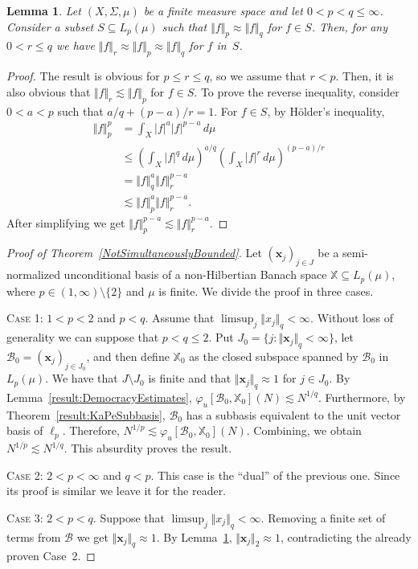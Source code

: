 \documentclass[11pt, leqno]{amsart}
\newtheorem{lemma}[theorem]{Lemma}
\theoremstyle{remark}
\numberwithin{equation}{section}
\newcommand{\XX}{\ensuremath{\mathbb{X}}}
\newcommand{\xx}{\ensuremath{\mathbf{x}}}
\newcommand{\BB}{\mathcal{B}}
\begin{document}
\begin{lemma}
\label{result:EquivalentNorms} 
Let $(X,\Sigma,\mu)$ be a finite measure space and let $0<p<q\le \infty$. Consider a subset $S\subseteq L_p(\mu)$ such that $\Vert f\Vert_p\approx\Vert f\Vert_q$ for $f\in S$. Then, for any $0<r\le q$ we have $\Vert f\Vert_r \approx\Vert f\Vert_p\approx\Vert f\Vert_q$ for $f$ in~$S$.
\end{lemma}

\begin{proof} 
The result is obvious for $p\le r\le q$, so we assume that $r<p$. Then, it is also obvious that $\Vert f\Vert_r\lesssim \Vert f\Vert_p$ for $f\in S$. To prove the reverse inequality, consider $0<a<p$ such that $a/q+(p-a)/r=1$.
 For $f\in S$, by H\"older's inequality,
\begin{align*}
\Vert f\Vert_p^p 
&=\int_X |f|^a |f|^{p-a} \, d \mu\\
&\le \left( \int_X |f|^{q}\, d\mu \right)^{a/q} \left( \int_X |f|^{r}\, d\mu \right)^{(p-a)/r}\\
&=\Vert f\Vert_q^a \Vert f\Vert_r^{p-a}\\
&\lesssim \Vert f\Vert_p^a \Vert f\Vert_r^{p-a}.
\end{align*}
After simplifying we get $\Vert f\Vert_p^{p-a}\lesssim \Vert f\Vert_r^{p-a}$.
\end{proof}


\begin{proof}[Proof of Theorem~\ref{NotSimultaneouslyBounded}] 
Let $(\xx_j)_{j\in J}$ be a semi-normalized unconditional basis of a non-Hilbertian Banach space $\XX\subseteq L_p(\mu)$, where $p\in(1,\infty)\setminus\{2\}$ and $\mu$ is finite.
We divide the proof in three cases.

\smallskip

\noindent\textsc{Case 1:} $1<p<2$ and $p<q$. Assume that $\limsup_j \Vert x_j\Vert_q<\infty$.
Without loss of generality we can suppose that $p<q\le 2$.
Put $J_0=\{ j : \Vert \xx_j\Vert_q<\infty \}$, let $\BB_0=(\xx_j)_{j\in J_0}$, and then define
$\XX_0$ as the closed subspace spanned by $\BB_0$ in $L_p(\mu)$.
We have that $J\setminus J_0$ is finite and that
$\Vert \xx_j\Vert_q\approx 1$ for $j\in J_0$. By Lemma~\ref{result:DemocracyEstimates}, $\varphi_u[\BB_0,\XX_0](N)\lesssim N^{1/q}$. Furthermore, by
Theorem~\ref{result:KaPeSubbasis}, $\BB_0$ has a subbasis equivalent to the unit vector basis of $\ell_p$. Therefore,
$N^{1/p}\lesssim \varphi_u[\BB_0,\XX_0](N)$. Combining, we obtain $N^{1/p}\lesssim N^{1/q}$. This absurdity proves the result. %

\smallskip

\noindent\textsc{Case 2:} $2<p<\infty$ and $q<p$. This case is the ``dual'' of the previous one. Since  its proof is similar we leave it for the reader.

\smallskip

\noindent\textsc{Case 3:} $2<p<q$. Suppose that $\limsup_j \Vert x_j\Vert_q<\infty$. Removing a finite set of terms from $\BB$ we get
$\Vert \xx_j\Vert_q\approx 1$. By Lemma~\ref{result:EquivalentNorms}, $\Vert \xx_j\Vert_2 \approx 1$, contradicting the already proven Case~2.
\end{proof}
\end{document}
